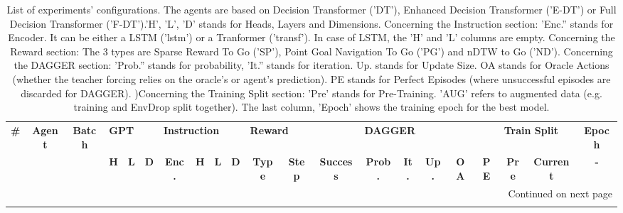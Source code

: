 \begin{longtable}{@{\hskip3pt}c@{\hskip3pt}c@{\hskip3pt}c@{\hskip3pt}c@{\hskip3pt}c@{\hskip3pt}c@{\hskip3pt}c@{\hskip3pt}c@{\hskip3pt}c@{\hskip3pt}c@{\hskip3pt}c@{\hskip3pt}c@{\hskip3pt}c@{\hskip3pt}c@{\hskip3pt}c@{\hskip3pt}c@{\hskip3pt}c@{\hskip3pt}c@{\hskip3pt}c@{\hskip3pt}c@{\hskip3pt}c}
\caption{List of experiments' configurations. \newline The agents are based on Decision Transformer ('DT'), Enhanced Decision Transformer ('E-DT') or Full Decision Transformer ('F-DT').\newline 'H', 'L', 'D' stands for Heads, Layers and Dimensions. \newline Concerning the Instruction section: 'Enc.'' stands for Encoder. It can be either a LSTM ('lstm') or a Tranformer ('transf'). In case of LSTM, the 'H' and 'L' columns are empty. \newline Concerning the Reward section: The 3 types are Sparse Reward To Go ('SP'), Point Goal Navigation To Go ('PG') and nDTW to Go ('ND'). \newline Concerning the DAGGER section: 'Prob.'' stands for probability, 'It.'' stands for iteration. Up. stands for Update Size. OA stands for Oracle Actions (whether the teacher forcing relies on the oracle's or agent's prediction). PE stands for Perfect Episodes (where unsuccessful episodes are discarded for DAGGER). )\newline Concerning the Training Split section: 'Pre' stands for Pre-Training. 'AUG' refers to augmented data (e.g. training and EnvDrop split together). The last column, 'Epoch' shows the training epoch for the best model.}\\
\toprule
\textbf{\#} & \textbf{Agent} & \textbf{Batch} & \multicolumn{3}{l}{\textbf{GPT}} & \multicolumn{4}{l}{\textbf{Instruction}} & \multicolumn{3}{l}{\textbf{Reward}} & \multicolumn{5}{l}{\textbf{DAGGER}} & \multicolumn{2}{l}{\textbf{Train Split}} & \textbf{Epoch} \\
 \textbf{~} &     \textbf{~} &     \textbf{~} &   \textbf{H} & \textbf{L} & \textbf{D} &        \textbf{Enc.} & \textbf{H} & \textbf{L} & \textbf{D} &   \textbf{Type} & \textbf{Step} & \textbf{Success} &  \textbf{Prob.} & \textbf{It.} & \textbf{Up.} & \textbf{OA} & \textbf{PE} &         \textbf{Pre} & \textbf{Current} &     \textbf{-} \\
\midrule
\endhead
\midrule
\multicolumn{21}{r}{{Continued on next page}} \\
\midrule
\endfoot


\end{longtable}
